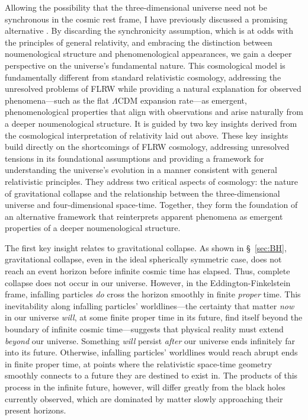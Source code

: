 \documentclass[aps,rmp,groupedaddress,twocolumn,10pt]{revtex4-2}
\begin{document}
Allowing the possibility that the three-dimensional universe need not be synchronous in the cosmic rest frame, I have previously discussed a promising alternative \cite{Janzen2012,Janzen2015}. By discarding the synchronicity assumption, which is at odds with the principles of general relativity, and embracing the distinction between noumenological structure and phenomenological appearances, we gain a deeper perspective on the universe's fundamental nature. This cosmological model is fundamentally different from standard relativistic cosmology, addressing the unresolved problems of FLRW while providing a natural explanation for observed phenomena---such as the flat $\Lambda$CDM expansion rate---as emergent, phenomenological properties that align with observations and arise naturally from a deeper noumenological structure. It is guided by two key insights derived from the cosmological interpretation of relativity laid out above. These key insights build directly on the shortcomings of FLRW cosmology, addressing unresolved tensions in its foundational assumptions and providing a framework for understanding the universe's evolution in a manner consistent with general relativistic principles. They address two critical aspects of cosmology: the nature of gravitational collapse and the relationship between the three-dimensional universe and four-dimensional space-time. Together, they form the foundation of an alternative framework that reinterprets apparent phenomena as emergent properties of a deeper noumenological structure.

The first key insight relates to gravitational collapse. As shown in \S~\ref{sec:BH}, gravitational collapse, even in the ideal spherically symmetric case, does not reach an event horizon before infinite cosmic time has elapsed. Thus, complete collapse does not occur in our universe. However, in the Eddington-Finkelstein frame, infalling particles \textit{do} cross the horizon smoothly in finite \textit{proper} time. This inevitability along infalling particles' worldlines---the certainty that matter \textit{now} in our universe \textit{will}, at some finite proper time in its future, find itself beyond the boundary of infinite cosmic time---suggests that physical reality must extend \textit{beyond} our universe. Something \textit{will} persist \textit{after} our universe ends infinitely far into its future. Otherwise, infalling particles' worldlines would reach abrupt ends in finite proper time, at points where the relativistic space-time geometry smoothly connects to a future they are destined to exist in. The products of this process in the infinite future, however, will differ greatly from the black holes currently observed, which are dominated by matter slowly approaching their present horizons.
\end{document}
